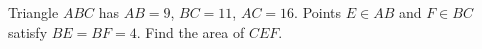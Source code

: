 Triangle $ ABC $ has $ AB=9 $, $ BC=11 $, $ AC=16 $. Points $ E\in AB $ and $ F\in BC $ satisfy $ BE=BF=4 $. Find the area of $ CEF $.
